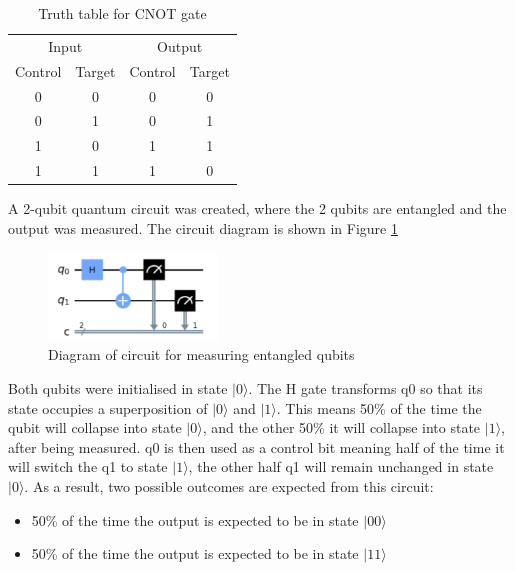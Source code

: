\begin{table}[h]
\centering
\begin{tabular}{cccc}
\multicolumn{2}{c}{Input}                         & \multicolumn{2}{c}{Output}   \\ 
\multicolumn{1}{c|}{Control} & \multicolumn{1}{c||}{Target} & \multicolumn{1}{c|}{Control} & Target \\ \hline\hline
\multicolumn{1}{c|}{0}  & \multicolumn{1}{c||}{0}  & \multicolumn{1}{c|}{0}  & 0  \\ \hline
\multicolumn{1}{c|}{0}  & \multicolumn{1}{c||}{1}  & \multicolumn{1}{c|}{0}  & 1  \\ \hline
\multicolumn{1}{c|}{1}  & \multicolumn{1}{c||}{0}  & \multicolumn{1}{c|}{1}  & 1  \\ \hline
\multicolumn{1}{c|}{1}  & \multicolumn{1}{c||}{1}  & \multicolumn{1}{c|}{1}  & 0 
\end{tabular}
\label{tab:cNotTruth}
\caption{Truth table for CNOT gate}
\end{table}

A 2-qubit quantum circuit was created, where the 2 qubits are entangled and the output was measured. The circuit diagram is shown in Figure \ref{fig:entangleMeasure}

\begin{figure}[h]
    \centering
    \includegraphics[width=0.4\textwidth]{lab2/images/entangleMeasure.png}
    \caption{Diagram of circuit for measuring entangled qubits} 
    \label{fig:entangleMeasure}
\end{figure}

Both qubits were initialised in state $|0\rangle$. The H gate transforms q0 so that its state occupies a superposition of $|0\rangle$ and $|1\rangle$. This means 50\% of the time the qubit will collapse into state $|0\rangle$, and the other 50\% it will collapse into state $|1\rangle$, after being measured. q0 is then used as a control bit meaning half of the time it will switch the q1 to state $|1\rangle$, the other half q1 will remain unchanged in state $|0\rangle$. As a result, two possible outcomes are expected from this circuit:
\begin{itemize}
    \item 50\% of the time the output is expected to be in state $|00\rangle$
    \item 50\% of the time the output is expected to be in state $|11\rangle$
\end{itemize}

